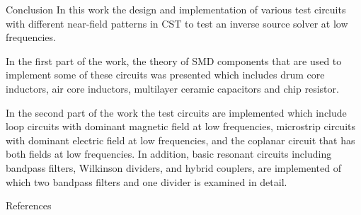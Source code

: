 \begin{frame}{Conclusion} 
In this work the design and implementation of various test circuits with different near-field patterns in CST to test an inverse source solver at low frequencies. 

In the first part of the work, the theory of SMD components that are used to implement some of these circuits was presented which includes drum core inductors, air core inductors, multilayer ceramic capacitors and chip resistor.

In the second part of the work the test circuits are implemented which include loop circuits with dominant magnetic field at low frequencies, microstrip circuits with dominant electric field at low frequencies, and the coplanar circuit that has both fields at low frequencies. In addition, basic resonant circuits including bandpass filters, Wilkinson dividers, and hybrid couplers, are implemented of which two bandpass filters and one divider is examined in detail.
\end{frame}

\begin{frame}[c, allowframebreaks]{References} 
	\printbibliography
\end{frame}


